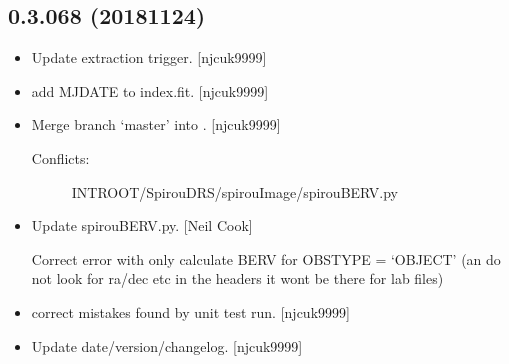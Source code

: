 \documentclass[a4paper,10pt,english]{report}
\begin{document}
\subsection{0.3.068 (2018\sphinxhyphen{}11\sphinxhyphen{}24)}
\label{\detokenize{misc/changelog:id274}}\begin{itemize}
\item {} 
Update extraction trigger. {[}njcuk9999{]}

\item {} 
 \sphinxhyphen{} add MJDATE to index.fit. {[}njcuk9999{]}

\item {} 
Merge branch ‘master’ into . {[}njcuk9999{]}
\begin{description}
\item[{Conflicts:}] \leavevmode
INTROOT/SpirouDRS/spirouImage/spirouBERV.py

\end{description}

\item {} 
Update spirouBERV.py. {[}Neil Cook{]}

Correct error with  \sphinxhyphen{} only calculate BERV for OBSTYPE = ‘OBJECT’ (an do not look for ra/dec etc in the headers \sphinxhyphen{} it wont be there for lab files)

\item {} 
 \sphinxhyphen{} correct mistakes found by unit test run.
{[}njcuk9999{]}

\item {} 
Update date/version/changelog. {[}njcuk9999{]}

\end{itemize}
\end{document}
